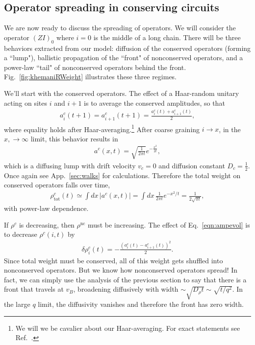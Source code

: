 \documentclass[a4paper,11pt]{article}
\renewcommand{\th}[1]{\frac{1}{#1}}
\newcommand{\abs}[1]{\left| #1 \right|}
\newcommand{\nc}{\text{nc}}
\newcommand{\tot}{\text{tot}}
\begin{document}
\subsection{Operator spreading in conserving circuits} \label{sub:consop}

We are now ready to discuss the spreading of operators. We will consider the operator $(ZI)_0$ where $i=0$ is the middle of a long chain. There will be three behaviors extracted from our model: diffusion of the conserved operators (forming a ``lump"), ballistic propagation of the ``front" of nonconserved operators, and a power-law ``tail" of nonconserved operators behind the front. Fig.~\ref{fig:khemaniRWeight} illustrates these three regimes.

We'll start with the conserved operators. The effect of a Haar-random unitary acting on sites $i$ and $i+1$ is to average the conserved amplitudes, so that
\begin{align}
a^c_i(t+1)=a^c_{i+1}(t+1) = \frac{a^c_i(t)+a^c_{i+1}(t)}{2}, \label{eqn:ampevol}
\end{align}
where equality holds after Haar-averaging.\footnote{We will we be cavalier about our Haar-averaging. For exact statements see Ref.~\cite{KhemaniOpSp}.} After coarse graining $i\to x$, in the $x, \to\infty$ limit, this behavior results in 
\begin{align}
a^c(x,t) = \sqrt{\frac{1}{2\pi t}}e^{-\frac{x^2}{2t}},
\end{align}
which is a diffusing lump with drift velocity $v_c=0$ and diffusion constant $D_c=\th{2}$. Once again see App.~\ref{sec:walks} for calculations. Therefore the total weight on conserved operators falls over time,
\begin{align}
\rho^c_\tot(t) \simeq \int dx\,\abs{a^c(x,t)} = \int dx\,\th{2\pi t}e^{-x^2/t} 
	=\th{2\sqrt{\pi t}}, \label{eqn:rhoc}
\end{align}
with power-law dependence.

If $\rho^c$ is decreasing, then $\rho^\nc$ must be increasing. The effect of Eq.~\ref{eqn:ampevol} is to decrease $\rho^c(i,t)$ by
\begin{align}
\delta \rho^c_i(t) = -\frac{(a^c_i(t)-a^c_{i+1}(t))^2}{2}.
\end{align}
Since total weight must be conserved, all of this weight gets shuffled into nonconserved operators. But we know how nonconserved operators spread! In fact, we can simply use the analysis of the previous section to say that there is a front that travels at $v_B$, broadening diffusively with width $\sim\sqrt{D_\rho t}\sim\sqrt{t/q^2}$. In the large $q$ limit, the diffusivity vanishes and therefore the front has zero width.
\end{document}
